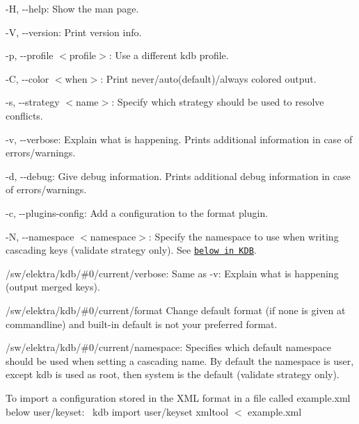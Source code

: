 \begin{DoxyItemize}
\item {\ttfamily -\/H}, {\ttfamily -\/-\/help}\+: Show the man page.
\item {\ttfamily -\/V}, {\ttfamily -\/-\/version}\+: Print version info.
\item {\ttfamily -\/p}, {\ttfamily -\/-\/profile $<$profile$>$}\+: Use a different kdb profile.
\item {\ttfamily -\/C}, {\ttfamily -\/-\/color $<$when$>$}\+: Print never/auto(default)/always colored output.
\item {\ttfamily -\/s}, {\ttfamily -\/-\/strategy $<$name$>$}\+: Specify which strategy should be used to resolve conflicts.
\item {\ttfamily -\/v}, {\ttfamily -\/-\/verbose}\+: Explain what is happening. Prints additional information in case of errors/warnings.
\item {\ttfamily -\/d}, {\ttfamily -\/-\/debug}\+: Give debug information. Prints additional debug information in case of errors/warnings.
\item {\ttfamily -\/c}, {\ttfamily -\/-\/plugins-\/config}\+: Add a configuration to the format plugin.
\item {\ttfamily -\/N}, {\ttfamily -\/-\/namespace $<$namespace$>$}\+: Specify the namespace to use when writing cascading keys ({\ttfamily validate} strategy only). See \href{#KDB}{\tt below in K\+DB}.
\end{DoxyItemize}


\begin{DoxyItemize}
\item {\ttfamily /sw/elektra/kdb/\#0/current/verbose}\+: Same as {\ttfamily -\/v}\+: Explain what is happening (output merged keys).
\item {\ttfamily /sw/elektra/kdb/\#0/current/format} Change default format (if none is given at commandline) and built-\/in default is not your preferred format.
\item {\ttfamily /sw/elektra/kdb/\#0/current/namespace}\+: Specifies which default namespace should be used when setting a cascading name. By default the namespace is user, except {\ttfamily kdb} is used as root, then {\ttfamily system} is the default ({\ttfamily validate} strategy only).
\end{DoxyItemize}

To import a configuration stored in the X\+ML format in a file called {\ttfamily example.\+xml} below {\ttfamily user/keyset}\+:~\newline
 {\ttfamily kdb import user/keyset xmltool $<$ example.\+xml}

